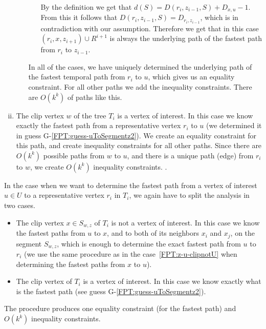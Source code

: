 \documentclass[a4paper,UKenglish,cleveref, autoref, thm-restate, anonymous]{lipics-v2021}
\begin{document}
\begin{enumerate}[(i)]
\begin{enumerate}[(a)]
\begin{itemize}
            By the definition we get that $d(S) = D(r_i,z_{i-1},S) + D_{x,u} - 1$.
            From this it follows that $D(r_i,z_{i-1},S) = D_{r_i, z_{i-1}}$, which is in contradiction with our assumption.
            Therefore we get that in this case 
            $(r_i, x, z_{i+1}) \cup R^{i+1}$ is always the underlying path of the fastest path from $r_i$ to $z_{i-1}$.
        \end{itemize}
       In all of the cases, we have uniquely determined the underlying path of the fastest temporal path from $r_i$ to $u$,
       which gives us an equality constraint.
       For all other paths we add the inequality constraints. 
       There are $O(k^k)$ of paths like this.
    \end{enumerate}
    
    \item The clip vertex $w$ of the tree $T_i$ is a vertex of interest.
    In this case we know exactly the fastest path from a representative vertex $r_i$ to $u$
    (we determined it in guess G-\ref{FPT:guess-uToSegmentz2}).
    We create an equality constraint for this path,
    and create inequality constraints for all other paths.
    Since there are $O(k^k)$ possible paths from $w$ to $u$, and there is a unique path (edge) from $r_i$ to $w$,
    we create $O(k^k)$ inequality constraints. .
\end{enumerate}

In the case when we want to determine the fastest path from a vertex of interest $u \in U$ to a representative vertex $r_i$ in $T_i$, we 
again have to split the analysis in two cases.
\begin{itemize}
    \item The clip vertex $x \in S_{w,z}$ of $T_i$ is not a vertex of interest.
    In this case
we know the fastest paths from $u$ to $x$, and to both of its neighbors $x_{i}$ and $x_{j}$, on the segment $S_{w,z}$,
which is enough to determine the exact fastest path from $u$ to $r_i$ 
(we use the same procedure as in the case~\ref{FPT:z-u-clipnotU} when determining the fastest paths from $x$ to $u$).
\item The clip vertex of $T_i$ is a vertex of interest.
    In this case
we know exactly what is the fastest path (see guess G-\ref{FPT:guess-uToSegmentz2}).
\end{itemize}
The procedure produces one equality constraint (for the fastest path) and $O(k^k)$ inequality constraints.
\end{document}
